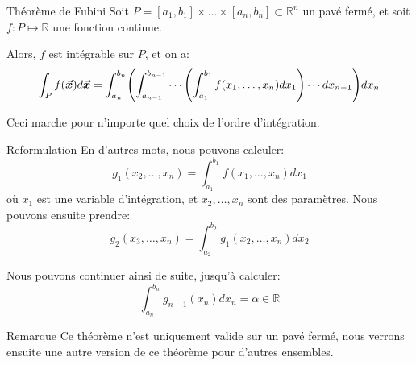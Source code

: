 \documentclass[a4paper]{article}
\begin{document}
\begin{parag}{Théorème de Fubini}
    Soit $P = \left[a_1, b_1\right] \times \ldots \times \left[a_n, b_n\right]\subset \mathbb{R}^{n}$ un pavé fermé, et soit $f: P \mapsto \mathbb{R}$ une fonction continue.

    Alors, $f$ est intégrable sur $P$, et on a: 
    \[\int_{P} f\left(\bvec{x}\right)d \bvec{x} = \int_{a_n}^{b_n} \left(\int_{a_{n-1}}^{b_{n-1}} \cdots \left(\int_{a_1}^{b_1} f\left(x_1, \ldots, x_n\right)dx_1\right) \cdots dx_{n-1}\right)dx_{n}\]

    Ceci marche pour n'importe quel choix de l'ordre d'intégration.

    \begin{subparag}{Reformulation}
        En d'autres mots, nous pouvons calculer: 
        \[g_1\left(x_2, \ldots, x_n\right) = \int_{a_1}^{b_1} f\left(x_1, \ldots, x_n\right)dx_1\]
        où $x_1$ est une variable d'intégration, et $x_2, \ldots, x_n$ sont des paramètres. Nous pouvons ensuite prendre: 
        \[g_2\left(x_3, \ldots, x_n\right) = \int_{a_2}^{b_2} g_1\left(x_2, \ldots, x_n\right)dx_2\]
        
        Nous pouvons continuer ainsi de suite, jusqu'à calculer: 
        \[\int_{a_n}^{b_n} g_{n-1}\left(x_n\right)dx_{n} = \alpha \in \mathbb{R}\]
    \end{subparag}
    
    \begin{subparag}{Remarque}
        Ce théorème n'est uniquement valide sur un pavé fermé, nous verrons ensuite une autre version de ce théorème pour d'autres ensembles.
    \end{subparag}
    
\end{parag}
\end{document}
